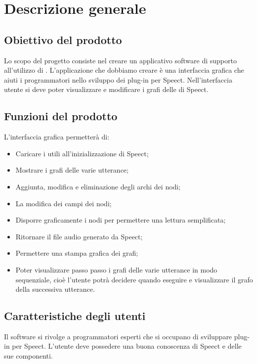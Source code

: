 \documentclass[../AnalisideiRequisiti.tex]{subfiles}
\begin{document}
	
\chapter{Descrizione generale}

\section{Obiettivo del prodotto}

Lo scopo del progetto consiste nel creare un applicativo software di supporto all’utilizzo di . L’applicazione che dobbiamo creare è una interfaccia grafica che aiuti i programmatori nello sviluppo dei plug-in per Speect. Nell’interfaccia utente si deve poter visualizzare e modificare i grafi delle  di Speect. 


\section{Funzioni del prodotto}
L’interfaccia grafica permetterà di:
\begin{itemize}
	\item{} Caricare i  utili all’inizializzazione di Speect;
	\item{} Mostrare i grafi delle varie utterance;
	\item{} Aggiunta, modifica e eliminazione degli archi dei nodi; 
	\item{} La modifica dei campi dei nodi;
	\item{} Disporre graficamente i nodi per permettere una lettura semplificata;
	\item{} Ritornare il file audio generato da Speect;
	\item{} Permettere una stampa grafica dei grafi;
	\item{} Poter visualizzare passo passo i grafi delle varie utterance in modo sequenziale, cioè l’utente potrà decidere quando eseguire e visualizzare il grafo della successiva utterance.	
\end{itemize}


\section{Caratteristiche degli utenti}
Il software si rivolge a programmatori esperti che si occupano di sviluppare plug-in per Speect. L'utente deve possedere una buona conoscenza di Speect e delle sue componenti.
\end{document}
